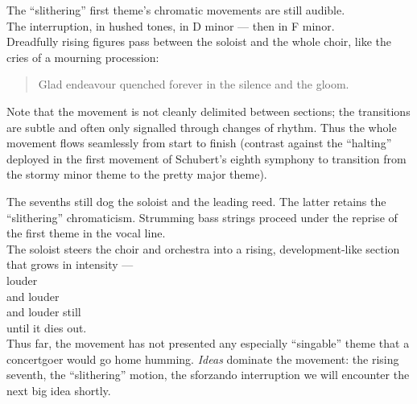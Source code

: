 \documentclass{beamer}
\begin{document}
\begin{frame}
  The ``slithering'' first theme's chromatic movements are still audible. 
  \pause \\ 
  The interruption, in hushed tones, in D minor --- \pause then in F minor. 
  \pause \\ 
  Dreadfully rising figures pass between the soloist and the whole choir, like the cries of a mourning procession: 
  \pause 
  \begin{quote} %
    G{\pause}l{\pause}a{\pause}d{\pause} e{\pause}n{\pause}d{\pause}e{\pause}a{\pause}v{\pause}o{\pause}u{\pause}r{\pause} q{\pause}u{\pause}e{\pause}n{\pause}c{\pause}h{\pause}e{\pause}d{\pause} f{\pause}o{\pause}r{\pause}e{\pause}v{\pause}e{\pause}r{\pause} i{\pause}n{\pause} t{\pause}h{\pause}e{\pause} s{\pause}i{\pause}l{\pause}e{\pause}n{\pause}c{\pause}e{\pause} a{\pause}n{\pause}d{\pause} t{\pause}h{\pause}e{\pause} g{\pause}l{\pause}o{\pause}o{\pause}m{\pause}. 
  \end{quote} 
  \pause 
  Note that the movement is not cleanly delimited between sections; the transitions are subtle and often only signalled through changes of rhythm. Thus the whole movement flows seamlessly from start to finish (contrast against the ``halting'' deployed in the first movement of Schubert's eighth symphony to transition from the stormy minor theme to the pretty major theme). 
\end{frame} 

\begin{frame}
  The sevenths still dog the soloist and the leading reed. The latter retains the ``slithering'' chromaticism. Strumming bass strings proceed under the reprise of the first theme in the vocal line. 
  \pause \\ 
  The soloist steers the choir and orchestra into a rising, development-like section that grows in intensity --- 
  \pause \\ 
  louder 
  \pause \\ 
  and louder 
  \pause \\ 
  and louder still
  \pause \\ 
  \textellipsis until it dies out. 
  \pause \\ 
  Thus far, the movement has not presented any especially ``singable'' theme that a concertgoer would go home humming. \emph{Ideas} dominate the movement: the rising seventh, the ``slithering'' motion, the sforzando interruption \textellipsis we will encounter the next big idea shortly. 
\end{frame} 
\end{document}

